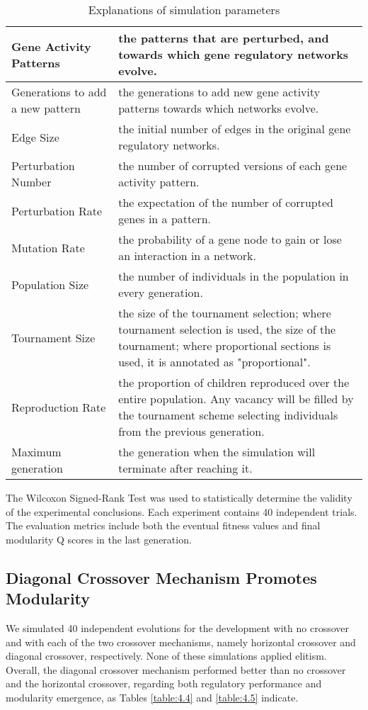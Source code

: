 \begin{table}[h]
	\centering
	\caption{Explanations of simulation parameters}
	\label{table:4.3}
	\begin{tabular}{|p{0.3\linewidth} | p{0.7\linewidth}|}
		\hline
		Gene Activity Patterns & the patterns that are perturbed, and towards which gene regulatory networks evolve. \\
		\hline
		Generations to add a new pattern & the generations to add new gene activity patterns towards which networks evolve. \\
		\hline
		Edge Size & the initial number of edges in the original gene regulatory networks. \\
		\hline
		Perturbation Number & the number of corrupted versions of each gene activity pattern. \\
		\hline
		Perturbation Rate & the expectation of the number of corrupted genes in a pattern. \\
		\hline
		Mutation Rate & the probability of a gene node to gain or lose an interaction in a network. \\
		\hline
		Population Size & the number of individuals in the population in every generation. \\
		\hline
		Tournament Size & the size of the tournament selection; where tournament selection is used, the size of the tournament; where proportional sections is used, it is annotated as "proportional". \\
		\hline
		Reproduction Rate & the proportion of children reproduced over the entire population. Any vacancy will be filled by the tournament scheme selecting individuals from the previous generation. \\
		\hline
		Maximum generation & the generation when the simulation will terminate after reaching it. \\
		\hline
	\end{tabular}
\end{table}

The Wilcoxon Signed-Rank Test was used to statistically determine the validity of the experimental conclusions. Each experiment contains 40 independent trials. The evaluation metrics include both the eventual fitness values and final modularity Q scores in the last generation.

\subsection{Diagonal Crossover Mechanism Promotes Modularity}
We simulated 40 independent evolutions for the development with no crossover and with each of the two crossover mechanisms, namely horizontal crossover and diagonal crossover, respectively. None of these simulations applied elitism. Overall, the diagonal crossover mechanism performed better than no crossover and the horizontal crossover, regarding both regulatory performance and modularity emergence, as Tables \ref{table:4.4} and \ref{table:4.5} indicate.

